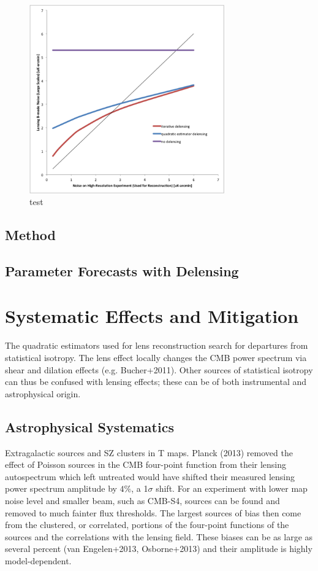 \begin{figure}[h]
\includegraphics[width=0.75\textwidth]{CMBLensing/delensingIterative.png}
\caption{test}
\end{figure}



\subsection{Method}


\subsection{Parameter Forecasts with Delensing}\label{delensForecast}


\section{Systematic Effects and Mitigation}\label{syst}
The quadratic estimators used for lens reconstruction search for departures from statistical isotropy.  The lens effect locally changes the CMB power spectrum via shear and dilation effects (e.g. Bucher+2011).  Other sources of statistical isotropy can thus be confused with lensing effects; these can be of both instrumental and astrophysical origin.

\subsection{Astrophysical Systematics}
Extragalactic sources and SZ clusters in T maps.  Planck (2013) removed the effect of Poisson sources in the CMB four-point function from their lensing autospectrum which left untreated would have shifted their measured lensing power spectrum amplitude by $4\%$, a  1$\sigma$ shift.  For an experiment with lower map noise level and smaller beam, such as CMB-S4, sources can be found and removed to much fainter flux thresholds.  The largest sources of bias then come from the clustered, or correlated, portions of the four-point functions of the sources and the correlations with the lensing field.  These biases can be as large as several percent (van Engelen+2013, Osborne+2013) and their amplitude is highly model-dependent. 

